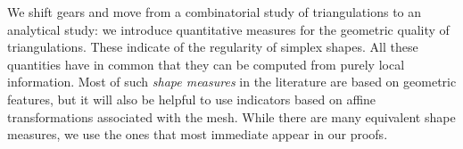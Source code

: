\documentclass[10pt,a4paper]{article}
\begin{document}
We shift gears and move from a combinatorial study of triangulations to an analytical study:
we introduce quantitative measures for the geometric quality of triangulations. 
These indicate of the regularity of simplex shapes. 
All these quantities have in common that they can be computed from purely local information. 
Most of such \emph{shape measures} in the literature are based on geometric features, 
but it will also be helpful to use indicators based on affine transformations associated with the mesh. %
While there are many equivalent shape measures, we use the ones that most immediate appear in our proofs.
\end{document}
